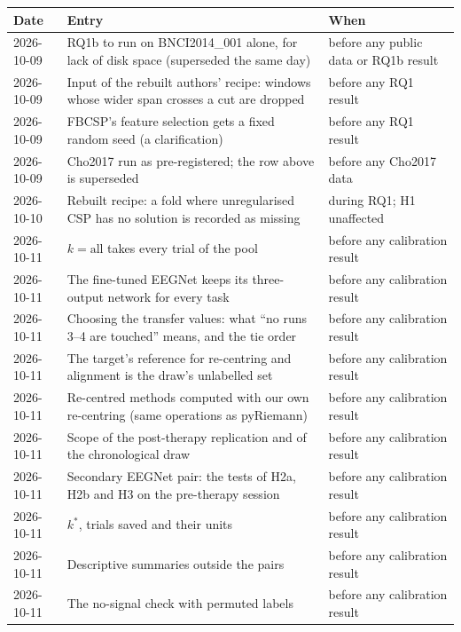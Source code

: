 \begin{center}
\footnotesize
\begin{tabularx}{\textwidth}{@{}p{1.6cm}>{\raggedright\arraybackslash}X>{\raggedright\arraybackslash}p{4.6cm}@{}}
\toprule
Date & Entry & When \\
\midrule
2026-10-09 & RQ1b to run on BNCI2014\_001 alone, for lack of disk space (superseded the same day) & before any public data or RQ1b result \\
2026-10-09 & Input of the rebuilt authors' recipe: windows whose wider span crosses a cut are dropped & before any RQ1 result \\
2026-10-09 & FBCSP's feature selection gets a fixed random seed (a clarification) & before any RQ1 result \\
2026-10-09 & Cho2017 run as pre-registered; the row above is superseded & before any Cho2017 data \\
2026-10-10 & Rebuilt recipe: a fold where unregularised CSP has no solution is recorded as missing & during RQ1; H1 unaffected \\
2026-10-11 & $k = \text{all}$ takes every trial of the pool & before any calibration result \\
2026-10-11 & The fine-tuned EEGNet keeps its three-output network for every task & before any calibration result \\
2026-10-11 & Choosing the transfer values: what ``no runs 3--4 are touched'' means, and the tie order & before any calibration result \\
2026-10-11 & The target's reference for re-centring and alignment is the draw's unlabelled set & before any calibration result \\
2026-10-11 & Re-centred methods computed with our own re-centring (same operations as pyRiemann) & before any calibration result \\
2026-10-11 & Scope of the post-therapy replication and of the chronological draw & before any calibration result \\
2026-10-11 & Secondary EEGNet pair: the tests of H2a, H2b and H3 on the pre-therapy session & before any calibration result \\
2026-10-11 & $k^*$, trials saved and their units & before any calibration result \\
2026-10-11 & Descriptive summaries outside the pairs & before any calibration result \\
2026-10-11 & The no-signal check with permuted labels & before any calibration result \\

\end{tabularx}
\end{center}
